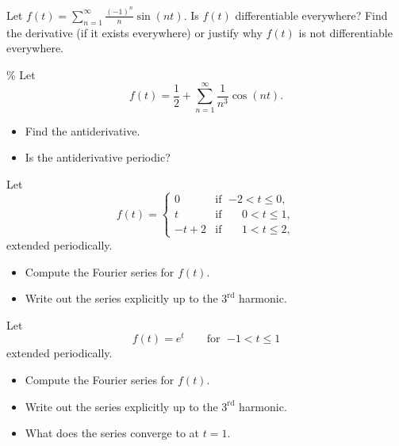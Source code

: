 \documentclass{ximera}
\begin{document}
\begin{exercise}
    Let $f(t) = \sum_{n=1}^\infty \frac{{(-1)}^n}{n} \sin (n t)$.  Is $f(t)$ differentiable everywhere?  Find the derivative (if it exists everywhere) or justify why $f(t)$ is not differentiable everywhere.
\end{exercise}

\begin{exercise}\%
    Let
    \begin{equation*}
        f(t) = \frac{1}{2} + \sum_{n=1}^\infty \frac{1}{n^3} \cos(n t) .
    \end{equation*}
    \begin{itemize}
        \item Find the antiderivative.
        \item Is the antiderivative periodic?
    \end{itemize}
\end{exercise}

\begin{exercise}
    Let
    \begin{equation*}
        f(t) =
        \begin{cases}
            0 & \text{if } \; {-2} < t \leq 0, \\
            t & \text{if } \; \phantom{-}0 < t \leq 1, \\
            -t+2 & \text{if } \; \phantom{-}1 < t \leq 2,
        \end{cases}
    \end{equation*}
    extended periodically.
    \begin{itemize}
        \item Compute the Fourier series for $f(t)$.
        \item Write out the series explicitly up to the $3^{\text{rd}}$ harmonic.
    \end{itemize}
\end{exercise}

\begin{exercise}
    Let
    \begin{equation*}
        f(t) = e^t \qquad \text{for } \; {-1} < t \leq 1
    \end{equation*}
    extended periodically.
    \begin{itemize}
        \item Compute the Fourier series for $f(t)$.
        \item Write out the series explicitly up to the $3^{\text{rd}}$ harmonic.
        \item What does the series converge to at $t=1$.
    \end{itemize}
\end{exercise}
\end{document}
